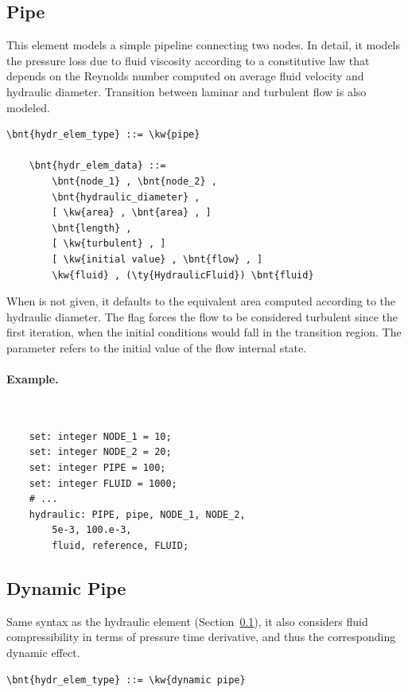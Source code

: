\subsection{Pipe}
\label{sec:EL:HYDR:PIPE}
This element models a simple pipeline connecting two  nodes.
In detail, it models the pressure loss due to fluid viscosity
according to a constitutive law that depends on the Reynolds number
computed on average fluid velocity and hydraulic diameter.
Transition between laminar and turbulent flow is also modeled.
\begin{Verbatim}[commandchars=\\\{\}]
    \bnt{hydr_elem_type} ::= \kw{pipe}

    \bnt{hydr_elem_data} ::=
        \bnt{node_1} , \bnt{node_2} ,
        \bnt{hydraulic_diameter} ,
        [ \kw{area} , \bnt{area} , ]
        \bnt{length} ,
        [ \kw{turbulent} , ]
        [ \kw{initial value} , \bnt{flow} , ]
        \kw{fluid} , (\ty{HydraulicFluid}) \bnt{fluid}
\end{Verbatim}
When  is not given, it defaults to the equivalent area
computed according to the hydraulic diameter.
The flag  forces the flow to be considered turbulent
since the first iteration, when the initial conditions would fall
in the transition region.
The  parameter refers to the initial value
of the flow internal state.

\paragraph{Example.} \
\begin{verbatim}
    set: integer NODE_1 = 10;
    set: integer NODE_2 = 20;
    set: integer PIPE = 100;
    set: integer FLUID = 1000;
    # ...
    hydraulic: PIPE, pipe, NODE_1, NODE_2,
        5e-3, 100.e-3,
        fluid, reference, FLUID;
\end{verbatim}



\subsection{Dynamic Pipe}
\label{sec:EL:HYDR:DYNAMIC_PIPE}
Same syntax as the  hydraulic element
(Section~\ref{sec:EL:HYDR:PIPE}),
it also considers fluid compressibility in terms of pressure time derivative,
and thus the corresponding dynamic effect.
\begin{Verbatim}[commandchars=\\\{\}]
    \bnt{hydr_elem_type} ::= \kw{dynamic pipe}
\end{Verbatim}




